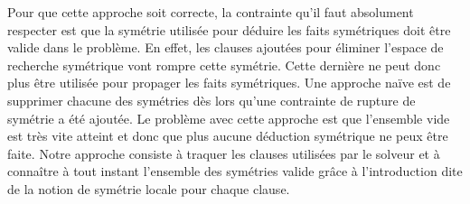 Pour que cette approche soit correcte, la contrainte qu'il faut absolument respecter est que la symétrie utilisée pour déduire les
faits symétriques doit être valide dans le problème. En effet, les clauses ajoutées pour éliminer l'espace de recherche
symétrique vont rompre cette symétrie. Cette dernière ne peut donc plus être utilisée pour propager les faits symétriques.
Une approche naïve est de supprimer chacune des symétries dès lors qu'une contrainte de rupture de symétrie a été ajoutée.
Le problème avec cette approche est que l'ensemble vide est très vite atteint et donc que plus aucune déduction symétrique ne peux être faite. Notre approche consiste à traquer les clauses utilisées par le solveur et à connaître à tout instant l'ensemble des symétries valide grâce à l'introduction dite de la notion de symétrie locale pour chaque clause.

\vspace{2em}

\begin{table}[!htbp]\footnotesize
	\centering
	\caption{Comparaison des approches sur les instances SAT.}
	\label{tab:satfr}
\end{table}%



